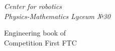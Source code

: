 \thispagestyle{titlestyle}
\begin{titlepage}
	
	\begin{center}
		\LARGE\textit{Center for robotics \\ Physics-Mathematics Lyceum №30}
        \begin{figure}[H]
        \end{figure}
		\vspace{3em}
		
		\LARGE{Engineering book of \\ Competition First FTC}
		

\end{center}
\end{titlepage}
